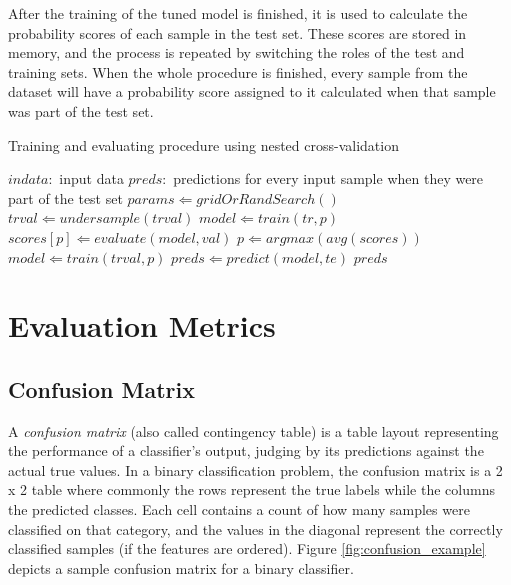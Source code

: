 \documentclass{kththesis}
\begin{document}
After the training of the tuned model is finished, it is used to calculate the probability scores of each sample in the test set. These scores are stored in memory, and the process is repeated by switching the roles of the test and training sets. When the whole procedure is finished, every sample from the dataset will have a probability score assigned to it calculated when that sample was part of the test set.

 \begin{algorithm}
\caption{Training and evaluating procedure using nested cross-validation}
\label{alg:train}
\begin{algorithmic}
	\REQUIRE $indata:$ input data 	
	\ENSURE $preds:$ predictions for every input sample when they were part of the test set 
	\STATE $params \Leftarrow gridOrRandSearch()$ 
		\STATE $trval \Leftarrow undersample(trval)$ 		
				\STATE $model \Leftarrow train(tr, p)$
				\STATE $scores[p] \Leftarrow evaluate(model, val)$	
			\ENDFOR
		\ENDFOR
		\STATE $p \Leftarrow argmax(avg(scores))$
		\STATE $model \Leftarrow train(trval, p)$
		\STATE $preds \Leftarrow predict(model, te)$
	\ENDFOR	
	\RETURN $preds$
	    
\end{algorithmic}
\end{algorithm} 

\section{Evaluation Metrics}

\subsection{Confusion Matrix}

A \emph{confusion matrix} (also called contingency table) is a table layout representing the performance of a classifier's output, judging by its predictions against the actual true values. In a binary classification problem, the confusion matrix is a 2 x 2 table where commonly the rows represent the true labels while the columns the predicted classes. Each cell contains a count of how many samples were classified on that category, and the values in the diagonal represent the correctly classified samples (if the features are ordered). Figure \ref{fig:confusion_example} depicts a sample confusion matrix for a binary classifier.
\end{document}
